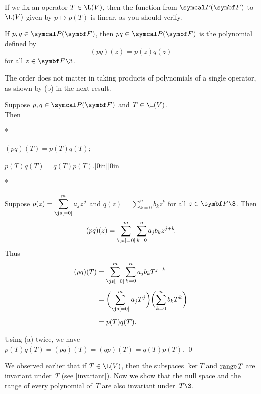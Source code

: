 If we fix an operator $T \in \L(V)$, then the function from $\P(\F{})$ to $\L(V)$ given by
$p \mapsto p(T)$ is linear, as you should  verify.

{If $p, q \in \P(\F{})$, then $pq \in \P(\F{})$ is the
polynomial defined by
\[
(pq)(z) = p(z) q(z)
\]
for all $z \in \F{}\3$.}

The order does not matter in taking products of polynomials of a single operator, as shown by (b) in the next result.

{Suppose $p, q \in \P(\F{})$ and $T \in \L(V)$.\\Then
\begin{subtheorem}*
\item
$(pq)(T) = p(T)q(T)$;
\item
$p(T)q(T) = q(T)p(T)$.\hfill \raisebox{-2bp}[0in][0in]{}
\end{subtheorem}
}

\proof
\begin{subtheorem}*
\item
Suppose $\displaystyle p(z) = \sum_{\js[=0]}^m a_j z^j$ and $\displaystyle q(z) = \sum_{k=0}^n b_k z^k$ for all $z \in \F{}\3$. Then
\[
(pq)(z) = \sum_{\js[=0]}^m \sum_{k=0}^n a_j b_k z^{j+k}\!.
\]
Thus
\begin{align*}
(pq)(T) &= \sum_{\js[=0]}^m \sum_{k=0}^n a_j b_k T^{j+k}\\[4bp]
&= \paren[\bigg]{ \sum_{\js[=0]}^m a_j T^j } \paren[\bigg]{ \sum_{k=0}^n b_k T^k } \\[4bp]
&= p(T) q(T).
\end{align*}

\item
Using (a) twice, we have $p(T)q(T) = (pq)(T) = (qp)(T) = q(T)p(T)$.
\qed
\end{subtheorem}

We observed earlier that if $T \in \L(V)$, then the subspaces $\ker T$ and $\operatorname{range} T$ are invariant under~$T$ (see \ref{invariant}).
Now we show that the null space and the range of every polynomial of~$T$ are also invariant under~$T\3$.


